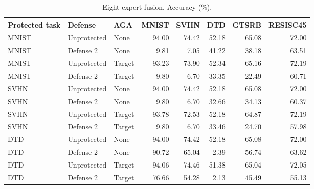 \begin{table}[t]
\centering\small
\caption{Eight-expert fusion. Accuracy (\%).}
\begin{tabular}{lllrrrrr}
\toprule
Protected task & Defense & AGA & MNIST & SVHN & DTD & GTSRB & RESISC45 \\
\midrule
MNIST & Unprotected & None & 94.00 & 74.42 & 52.18 & 65.08 & 72.00 \\
MNIST & Defense 2 & None & 9.81 & 7.05 & 41.22 & 38.18 & 63.51 \\
MNIST & Unprotected & Target & 93.23 & 73.90 & 52.34 & 65.16 & 72.19 \\
MNIST & Defense 2 & Target & 9.80 & 6.70 & 33.35 & 22.49 & 60.71 \\
SVHN & Unprotected & None & 94.00 & 74.42 & 52.18 & 65.08 & 72.00 \\
SVHN & Defense 2 & None & 9.80 & 6.70 & 32.66 & 34.13 & 60.37 \\
SVHN & Unprotected & Target & 93.78 & 72.53 & 52.18 & 64.87 & 72.19 \\
SVHN & Defense 2 & Target & 9.80 & 6.70 & 33.46 & 24.70 & 57.98 \\
DTD & Unprotected & None & 94.00 & 74.42 & 52.18 & 65.08 & 72.00 \\
DTD & Defense 2 & None & 90.72 & 65.04 & 2.39 & 56.74 & 63.62 \\
DTD & Unprotected & Target & 94.06 & 74.46 & 51.38 & 65.04 & 72.05 \\
DTD & Defense 2 & Target & 76.66 & 54.28 & 2.13 & 45.49 & 55.13 \\
\bottomrule
\end{tabular}
\end{table}
